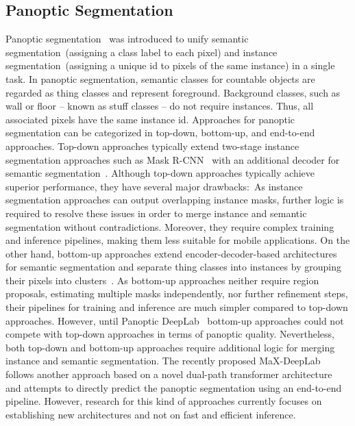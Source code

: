\documentclass[conference]{IEEEtran}
\begin{document}
\subsection{Panoptic Segmentation}
\label{sec:related_work:panoptic_segmentation}
Panoptic segmentation~\cite{PanopticSegmentation-cvpr2019} was introduced to unify semantic segmentation~(assigning a class label to each pixel) and instance segmentation~(assigning a unique id to pixels of the same instance) in a single task.
In panoptic segmentation, semantic classes for countable objects are regarded as thing classes and represent foreground.
Background classes, such as wall or floor -- known as stuff classes -- do not require instances.
Thus, all associated pixels have the same instance id.
Approaches for panoptic segmentation can be categorized in top-down, bottom-up, and end-to-end approaches.
Top-down approaches typically extend two-stage instance segmentation approaches such as Mask R-CNN~\cite{MaskRCNN-iccv2017} with an additional decoder for semantic segmentation~\cite{PanopticFPN-cvpr2019, UPSNet-cvpr2019}.
Although top-down approaches typically achieve superior performance, they have several major drawbacks:~As instance segmentation approaches can output overlapping instance masks, further logic is required to resolve these issues in order to merge instance and semantic segmentation without contradictions.
Moreover, they require complex training and inference pipelines, making them less suitable for mobile applications.
On the other hand, bottom-up approaches extend encoder-decoder-based architectures for semantic segmentation and separate thing classes into instances by grouping their pixels into clusters~\cite{DeeperLab-arxiv2019, SSAP-iccv2019, PanopticDeeplab-cvpr2020}.
As bottom-up approaches neither require region proposals, estimating multiple masks independently, nor further refinement steps, their pipelines for training and inference are much simpler compared to top-down approaches.
However, until Panoptic DeepLab~\cite{PanopticDeeplab-cvpr2020} bottom-up approaches could not compete with top-down approaches in terms of panoptic quality.
Nevertheless, both top-down and bottom-up approaches require additional logic for merging instance and semantic segmentation. 
The recently proposed MaX-DeepLab~\cite{Max-Deeplab-cvpr2021} follows another approach based on a novel dual-path transformer architecture~\cite{Transformer-neurips2017} and attempts to directly predict the panoptic segmentation using an end-to-end pipeline.
However, research for this kind of approaches currently focuses on establishing new architectures and not on fast and efficient inference.
\end{document}
